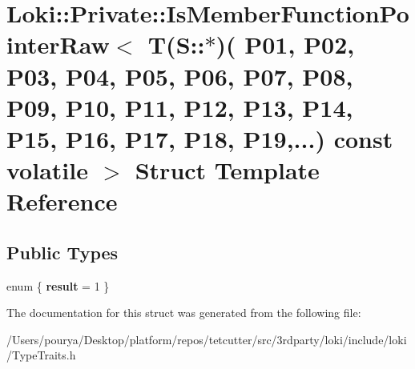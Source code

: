 \hypertarget{structLoki_1_1Private_1_1IsMemberFunctionPointerRaw_3_01T_07S_1_1_5_08_07_01_01_01_01_01_01_01_07e505a6837382e5a592e98efb5ad6aca}{}\section{Loki\+:\+:Private\+:\+:Is\+Member\+Function\+Pointer\+Raw$<$ T(S\+:\+:$\ast$)( P01, P02, P03, P04, P05, P06, P07, P08, P09, P10, P11, P12, P13, P14, P15, P16, P17, P18, P19,...) const volatile $>$ Struct Template Reference}
\label{structLoki_1_1Private_1_1IsMemberFunctionPointerRaw_3_01T_07S_1_1_5_08_07_01_01_01_01_01_01_01_07e505a6837382e5a592e98efb5ad6aca}
\subsection*{Public Types}
\begin{DoxyCompactItemize}
\item 
\hypertarget{structLoki_1_1Private_1_1IsMemberFunctionPointerRaw_3_01T_07S_1_1_5_08_07_01_01_01_01_01_01_01_07e505a6837382e5a592e98efb5ad6aca_aad93fee6802956d111e3fb680090c9a5}{}enum \{ {\bfseries result} = 1
 \}\label{structLoki_1_1Private_1_1IsMemberFunctionPointerRaw_3_01T_07S_1_1_5_08_07_01_01_01_01_01_01_01_07e505a6837382e5a592e98efb5ad6aca_aad93fee6802956d111e3fb680090c9a5}

\end{DoxyCompactItemize}


The documentation for this struct was generated from the following file\+:\begin{DoxyCompactItemize}
\item 
/\+Users/pourya/\+Desktop/platform/repos/tetcutter/src/3rdparty/loki/include/loki/Type\+Traits.\+h\end{DoxyCompactItemize}
